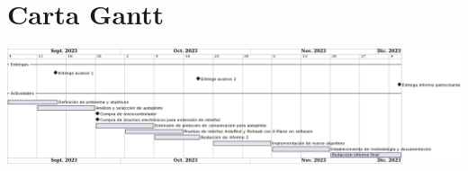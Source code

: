 \documentclass{report}
\begin{document}

\tableofcontents





\printbibliography
\appendix
\chapter{Carta Gantt}
\begin{center}
    \centering
    \includegraphics[width=\textwidth]{img/gantt.png}
\end{center}
\end{document}
